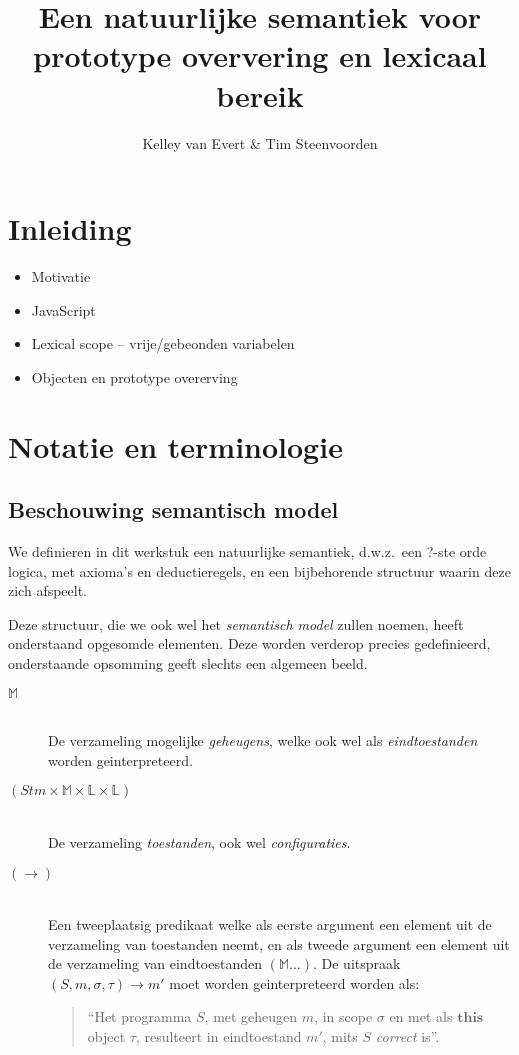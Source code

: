 \documentclass[11pt,oneside,parskip=half]{scrbook}
\newcommand{\<}
  {\ensuremath{\langle}}
\renewcommand{\>}
  {\ensuremath{\rangle}}
\begin{document}
\title{Een natuurlijke semantiek voor prototype oververing en lexicaal bereik}
\author{Kelley van Evert \& Tim Steenvoorden}
\maketitle

\frontmatter

\tableofcontents

\mainmatter

\chapter{Inleiding}

\begin{itemize}
	\item Motivatie
	\item JavaScript
	\item Lexical scope -- vrije/gebeonden variabelen
	\item Objecten en prototype overerving
\end{itemize}

\chapter{Notatie en terminologie}

\section{Beschouwing semantisch model}

We definieren in dit werkstuk een natuurlijke semantiek, d.w.z.~een ?-ste orde logica, met axioma's en deductieregels, en een bijbehorende structuur waarin deze zich afspeelt.

Deze structuur, die we ook wel het \emph{semantisch model} zullen noemen, heeft onderstaand opgesomde elementen. Deze worden verderop precies gedefinieerd, onderstaande opsomming geeft slechts een algemeen beeld.

\begin{description}
	\item[$\mathbb{M}$]\hfill\\ De verzameling mogelijke \emph{geheugens}, welke ook wel als \emph{eindtoestanden} worden geinterpreteerd.
	\item[$(\mathit{Stm} \times \mathbb{M} \times \mathbb{L} \times \mathbb{L})$]\hfill\\ De verzameling \emph{toestanden}, ook wel \emph{configuraties}.
	\item[$(\longrightarrow)$]\hfill\\ Een tweeplaatsig predikaat welke als eerste argument een element uit de verzameling van toestanden neemt, en als tweede argument een element uit de verzameling van eindtoestanden $(\mathbb{M}\dots)$. De uitspraak $(S, m, \sigma, \tau) \longrightarrow m'$ moet worden geinterpreteerd worden als:
	\begin{quote} ``Het programma $S$, met geheugen $m$, in scope $\sigma$ en met als $\mathbf{this}$ object $\tau$, resulteert in eindtoestand $m'$, mits $S$ \emph{correct} is''. \end{quote}
\end{description}
\end{document}
